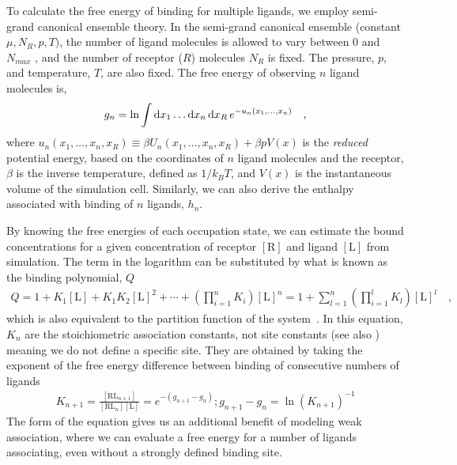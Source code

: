 \documentclass[10pt,final]{article}
\begin{document}
To calculate the free energy of binding for multiple ligands, we employ semi-grand canonical ensemble theory.
%
In the semi-grand canonical ensemble (constant $\mu, N_R, p, T)$, the number of ligand molecules is allowed to vary between 0 and $N_{max}$ , and the number of receptor ($R$) molecules $N_R$ is fixed.
%
The pressure, $p$, and temperature, $T$, are also fixed. The free energy of observing $n$ ligand molecules is,
\begin{align}
 g_n = \ln \int \dif x_1 \dots \dif x_n \dif x_R \, e^{-u_n(x_1,\dots,x_n)} \quad,
\end{align}
%
where  $u_n(x_1,\ldots,x_n,x_R) \equiv \beta U_n(x_1,\ldots,x_n,x_R) + \beta p V(x)$ is the \textit{reduced} potential energy, based on the coordinates of $n$ ligand molecules and the receptor, $\beta$ is the inverse temperature, defined as $1/k_BT$, and $V(x)$ is the instantaneous volume of the simulation cell. Similarly, we can also derive the enthalpy associated with binding of $n$ ligands, $h_n$.

By knowing the free energies of each occupation state, we can estimate the bound concentrations for a given concentration of receptor $[\mathrm{R}]$ and ligand $[\mathrm{L}]$ from simulation.
%
The term in the logarithm can be substituted by what is known as the binding polynomial, $Q$
%
\begin{align}
 Q = 1 + K_1[\mathrm{L}] + K_1K_2[\mathrm{L}]^2 + \cdots + \left(\prod\limits_{i=1}^{n} K_i\right) [\mathrm{L}]^n = 1 + \sum\limits_{l=1}^n \left(\prod\limits_{i=1}^{l} K_l\right)[\mathrm{L}]^l \quad,
 \label{equation:bindingpolynomial}
\end{align}                                                    
which is also equivalent to the partition function of the system~\autocite{Dill2010a}.
%
In this equation, $K_n$ are the stoichiometric association constants, not site constants (see also ) meaning we do not define a specific site.
%
They are obtained by taking the exponent of the free energy difference between binding of consecutive numbers of ligands
\begin{align}
K_{n+1} = \frac{[\mathrm{RL}_{n+1}]}{[\mathrm{RL}_n][\mathrm{L}]} = e^{-(g_{n+1}-g_n)} ; g_{n+1} - g_n = \ln (K_{n+1})^{-1}
\label{eq:K_eq}
\end{align}
%
The form of the equation gives us an additional benefit of modeling weak association, where we can evaluate a free energy for a number of ligands associating, even without a strongly defined binding site.
\end{document}
